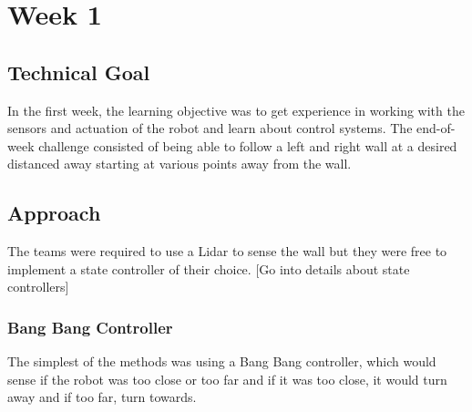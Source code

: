 \documentclass[journal, a4paper]{IEEEtran}
\begin{document}
\section{Week 1}
\subsection{Technical Goal}
In the first week, the learning objective was to get experience in working with the sensors and actuation of the robot and learn about control systems. The end-of-week challenge consisted of being able to follow a left and right wall at a desired distanced away starting at various points away from the wall. 
\subsection{Approach}
The teams were required to use a Lidar to sense the wall but they were free to implement a state controller of their choice. [Go into details about state controllers]
\subsubsection{Bang Bang Controller}The simplest of the methods was using a Bang Bang controller, which would sense if the robot was too close or too far and if it was too close, it would turn away and if too far, turn towards. 
\end{document}
